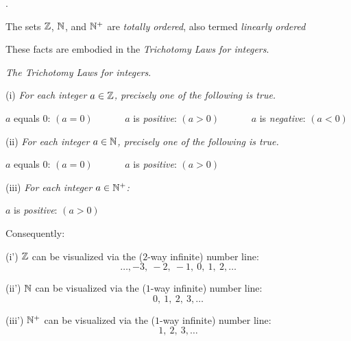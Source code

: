  
 .


The sets $\mathbb{Z}$, $\mathbb{N}$, and $\mathbb{N}^+$ are {\em totally ordered}, also termed {\em linearly ordered}

\smallskip

  

These facts are embodied in the {\em Trichotomy Laws for integers}.

\medskip

{\it The Trichotomy Laws for integers}.

\smallskip

(i)
{\it For each integer $a \in \mathbb{Z}$, precisely one of the following is true.}

\hspace*{.2in} $a$ equals $0$: $(a=0)$ \ \ \ \ \ \
 $a$ is {\em positive}: $(a>0)$ \ \ \ \ \ \
 $a$ is {\em negative}: $(a<0)$

\smallskip

(ii)
{\it For each integer $a \in \mathbb{N}$, precisely one of the following is true.}

\hspace*{.2in} $a$ equals $0$: $(a=0)$ \ \ \ \ \ \ $a$ is {\em positive}: $(a>0)$

\smallskip

(iii)
{\it For each integer $a \in \mathbb{N}^+$:}

\hspace*{.2in} $a$ is {\em positive}: $(a>0)$

\bigskip

Consequently:
\smallskip


(i')
$\mathbb{Z}$ can be visualized via the ($2$-way infinite) number line:
\[ \ldots, -3, \  -2, \ -1, \ 0, \ 1,\  2, \ldots \]

\smallskip

(ii')
$\mathbb{N}$ can be visualized via the ($1$-way infinite) number line:
\[  0, \ 1, \ 2, \ 3, \ldots \]

\smallskip

(iii')
$\mathbb{N}^+$ can be visualized via the ($1$-way infinite) number line:
\[  1, \ 2, \ 3, \ldots \]

\medskip

